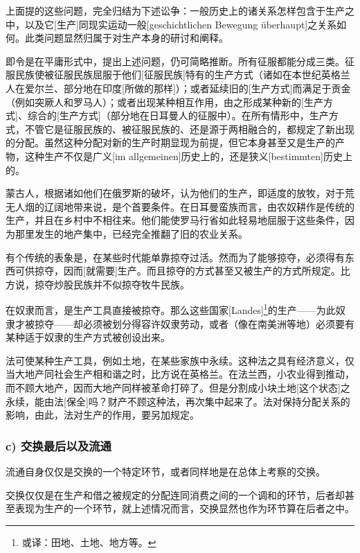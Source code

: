 \documentclass[a4paper,twoside,12pt]{ctexart}
\begin{document}
上面提的这些问题，完全归结为下述讼争：一般历史上的诸关系怎样包含于生产之中，以及它[生产]同现实运动一般[geschichtlichen Bewegung überhaupt]之关系如何。此类问题显然归属于对生产本身的研讨和阐释。


即令是在平庸形式中，提出上述问题，仍可简略推断。所有征服都能分成三类。征服民族使被征服民族屈服于他们[征服民族]特有的生产方式（诸如在本世纪英格兰人在爱尔兰、部分地在印度[所做的那样]）；或者延续旧的[生产方式]而满足于贡金（例如突厥人和罗马人）；或者出现某种相互作用，由之形成某种新的[生产方式]、综合的[生产方式]（部分地在日耳曼人的征服中）。在所有情形中，生产方式，不管它是征服民族的、被征服民族的、还是源于两相融合的，都规定了新出现的分配。虽然这种分配对新的生产时期显现为前提，但它本身甚至又是生产的产物，这种生产不仅是广义[im allgemeinen]历史上的，还是狭义[bestimmten]历史上的。

蒙古人，根据诸如他们在俄罗斯的破坏，认为他们的生产，即适度的放牧，对于荒无人烟的辽阔地带来说，是个首要条件。在日耳曼蛮族而言，由农奴耕作是传统的生产，并且在乡村中不相往来。他们能使罗马行省如此轻易地屈服于这些条件，因为那里发生的地产集中，已经完全推翻了旧的农业关系。

有个传统的表象是，在某些时代能单靠掠夺过活。然而为了能够掠夺，必须得有东西可供掠夺，因而[就需要]生产。而且掠夺的方式甚至又被生产的方式所规定。比方说，掠夺炒股民族并不似掠夺牧牛民族。


在奴隶而言，是生产工具直接被掠夺。那么这些国家[Landes]\footnote{或译：田地、土地、地方等。}的生产——为此奴隶才被掠夺——却必须被划分得容许奴隶劳动，或者（像在南美洲等地）必须要有某种适于奴隶的生产方式被创设出来。

法可使某种生产工具，例如土地，在某些家族中永续。这种法之具有经济意义，仅当大地产同社会生产相和谐之时，比方说在英格兰。在法兰西，小农业得到推动，而不顾大地产，因而大地产同样被革命打碎了。但是分割成小块土地[这个状态]之永续，能由法[保全]吗？财产不顾这种法，再次集中起来了。法对保持分配关系的影响，由此，法对生产的作用，要另加规定。


\subsubsection{c) 交换最后以及流通}

流通自身仅仅是交换的一个特定环节，或者同样地是在总体上考察的交换。

交换仅仅是在生产和借之被规定的分配连同消费之间的一个调和的环节，后者却甚至表现为生产的一个环节，就上述情况而言，交换显然也作为环节算在后者之中。 
\end{document}
